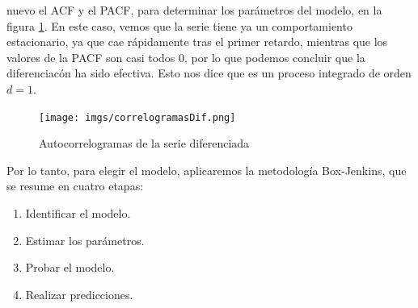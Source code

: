\documentclass[a4paper,onecolumn]{extarticle}
\begin{document}
\begin{sloppypar}
nuevo el ACF y el PACF, para determinar los parámetros del modelo, en la figura \ref{fig:autocorrelogramasDif}. En este caso, vemos que la serie tiene ya un 
comportamiento estacionario, ya que cae rápidamente tras el primer retardo, mientras que los valores de la PACF son casi todos 0, por lo que podemos concluir 
que la diferenciacón ha sido efectiva. Esto nos dice que es un proceso integrado de orden $d=1$.
\begin{center}
    \begin{figure}[h!]
        \centering
        \texttt{[image: imgs/correlogramasDif.png]}
        \caption{Autocorrelogramas de la serie diferenciada} \label{fig:autocorrelogramasDif}
    \end{figure}
\end{center}

Por lo tanto, para elegir el modelo, aplicaremos la metodología Box-Jenkins, que se resume en cuatro etapas:
\begin{enumerate}
    \item Identificar el modelo.
    \item Estimar los parámetros.
    \item Probar el modelo.
    \item Realizar predicciones.
\end{enumerate}


\end{sloppypar}
\end{document}

